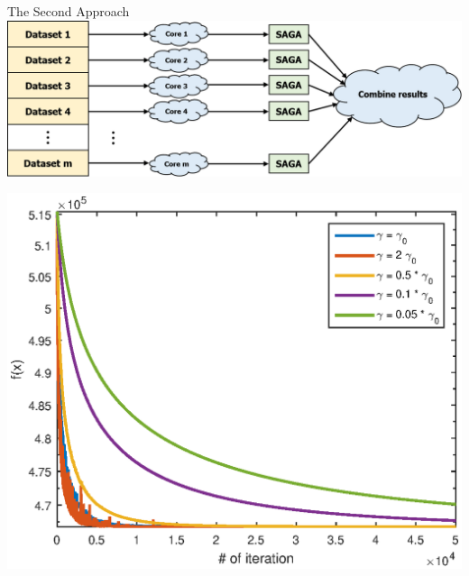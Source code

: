 \begin{frame}{The Second Approach}
	\centering
	\includegraphics[scale=0.35]{Picture2.PNG}
	
	\centering
	\includegraphics[scale=0.5]{distributed3.eps} 
\end{frame}

